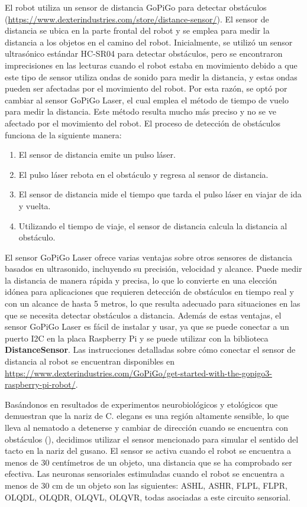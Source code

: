 El robot utiliza un sensor de distancia GoPiGo para detectar obstáculos (\url{https://www.dexterindustries.com/store/distance-sensor/}). El sensor de distancia se ubica en la parte frontal del robot y se emplea para medir la distancia a los objetos en el camino del robot. Inicialmente, se utilizó un sensor ultrasónico estándar HC-SR04 para detectar obstáculos, pero se encontraron imprecisiones en las lecturas cuando el robot estaba en movimiento debido a que este tipo de sensor utiliza ondas de sonido para medir la distancia, y estas ondas pueden ser afectadas por el movimiento del robot. Por esta razón, se optó por cambiar al sensor GoPiGo Laser, el cual emplea el método de tiempo de vuelo para medir la distancia. Este método resulta mucho más preciso y no se ve afectado por el movimiento del robot. El proceso de detección de obstáculos funciona de la siguiente manera:


\begin{enumerate}
\item El sensor de distancia emite un pulso láser.
\item El pulso láser rebota en el obstáculo y regresa al sensor de distancia.
\item El sensor de distancia mide el tiempo que tarda el pulso láser en viajar de ida y vuelta.
\item Utilizando el tiempo de viaje, el sensor de distancia calcula la distancia al obstáculo.
\end{enumerate}


El sensor GoPiGo Laser ofrece varias ventajas sobre otros sensores de distancia basados en ultrasonido, incluyendo su precisión, velocidad y alcance. Puede medir la distancia de manera rápida y precisa, lo que lo convierte en una elección idónea para aplicaciones que requieren detección de obstáculos en tiempo real y con un alcance de hasta 5 metros, lo que resulta adecuado para situaciones en las que se necesita detectar obstáculos a distancia. Además de estas ventajas, el sensor GoPiGo Laser es fácil de instalar y usar, ya que se puede conectar a un puerto I2C en la placa Raspberry Pi y se puede utilizar con la biblioteca \textbf{DistanceSensor}. Las instrucciones detalladas sobre cómo conectar el sensor de distancia al robot se encuentran disponibles en \url{https://www.dexterindustries.com/GoPiGo/get-started-with-the-gopigo3-raspberry-pi-robot/}.


Basándonos en resultados de experimentos neurobiológicos y etológicos que demuestran que la nariz de C. elegans es una región altamente sensible, lo que lleva al nematodo a detenerse y cambiar de dirección cuando se encuentra con obstáculos (), decidimos utilizar el sensor mencionado para simular el sentido del tacto en la nariz del gusano. El sensor se activa cuando el robot se encuentra a menos de 30 centímetros de un objeto, una distancia que se ha comprobado ser efectiva. Las neuronas sensoriales estimuladas cuando el robot se encuentra a menos de 30 cm de un objeto son las siguientes: ASHL, ASHR, FLPL, FLPR, OLQDL, OLQDR, OLQVL, OLQVR, todas asociadas a este circuito sensorial.


